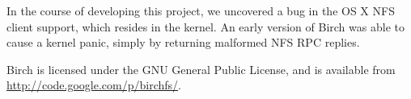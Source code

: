 \documentclass{article}
\begin{document}
In the course of developing this project, we uncovered a bug in the OS
X NFS client support, which resides in the kernel. An early version of
Birch was able to cause a kernel panic, simply by returning malformed
NFS RPC replies.

Birch is licensed under the GNU General Public License, and is
available from \url{http://code.google.com/p/birchfs/}.



\vfill
\begin{center}
\end{center}
\vfill
\end{document}
